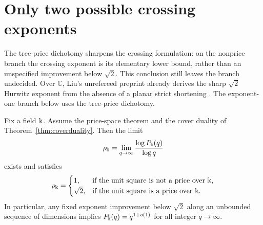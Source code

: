 \section{Only two possible crossing exponents}
\label{sec:crossing-exponent-gap}

The tree-price dichotomy sharpens the crossing formulation:
on the nonprice branch the crossing exponent is its elementary
lower bound, rather than an unspecified improvement below \(\sqrt2\).
This conclusion still leaves the branch undecided.
Over \(\mathbb C\), Liu's unrefereed preprint already derives the sharp
\(\sqrt2\) Hurwitz exponent from the absence of a planar strict
shortening \cite[p.~3, \emph{Two crossing cuts}]{Liu2026noncommutative}.
The exponent-one branch below uses the tree-price dichotomy.

\begin{theorem}
\label{thm:crossing-exponent-dichotomy}
Fix a field \(\Bbbk\). Assume the price-space theorem
\cite[Proposition C.3, p.~28]{Anthropic2026} and the cover duality
of Theorem~\ref{thm:coverduality}. Then the limit
\[
 \rho_\Bbbk=\lim_{q\to\infty}\frac{\log P_\Bbbk(q)}{\log q}
\]
exists and satisfies
\begin{equation}\label{eq:crossing-exponent-dichotomy}
 \rho_\Bbbk=
 \begin{cases}
  1,&\text{if the unit square is not a price over }\Bbbk,\\
  \sqrt2,&\text{if the unit square is a price over }\Bbbk.
 \end{cases}
\end{equation}
In particular, any fixed exponent improvement below \(\sqrt2\)
along an unbounded sequence of dimensions implies
\(P_\Bbbk(q)=q^{1+o(1)}\) for all integer \(q\to\infty\).
\end{theorem}
